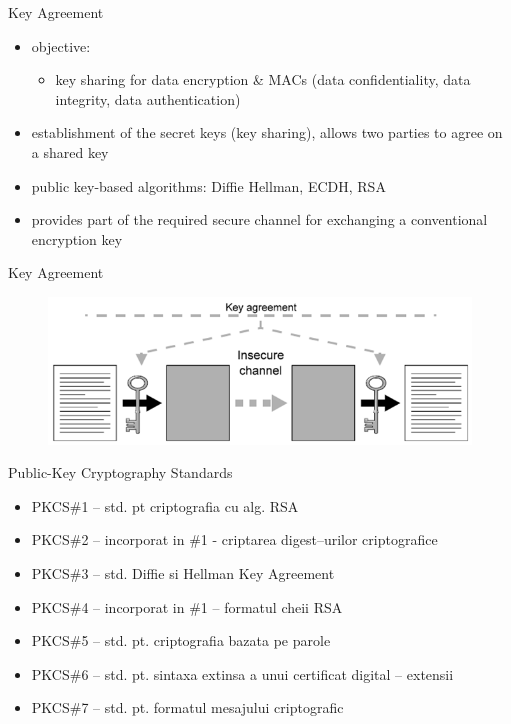 \documentclass[pdf]{beamer}
\begin{document}
\begin{frame}{Key Agreement}
\begin{itemize}
\item
objective: 
\begin{itemize}
\item
key sharing for data encryption \& MACs (data confidentiality, data integrity, data authentication)
\end{itemize}

\item
establishment of the secret keys (key sharing), allows two parties to agree on a shared key

\item
public key-based algorithms: Diffie Hellman, ECDH, RSA

\item
provides part of the required secure channel for exchanging a conventional encryption key

\end{itemize}
\end{frame}



\begin{frame}{Key Agreement}
\begin{figure}[t]
\centering
\includegraphics[scale=0.6]{Images/ka}
\end{figure}
\end{frame}



\begin{frame}{Public-Key Cryptography Standards}
\begin{itemize}
\item
PKCS\#1 – std. pt criptografia cu alg. RSA
\item
PKCS\#2 – incorporat in \#1 - criptarea digest–urilor criptografice   
\item
PKCS\#3 – std. Diffie si Hellman Key Agreement
\item
PKCS\#4 – incorporat in \#1 – formatul cheii RSA
\item
PKCS\#5 – std. pt. criptografia bazata pe parole
\item
PKCS\#6 – std. pt. sintaxa extinsa a unui certificat digital – extensii
\item
PKCS\#7 – std. pt. formatul mesajului criptografic
\end{itemize}
\end{frame}
\end{document}
